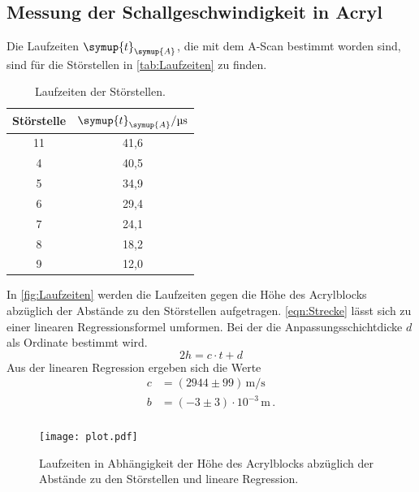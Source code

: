 \subsection{Messung der Schallgeschwindigkeit in Acryl}
\label{sec:SchallgeschwindigkeitAcryl}
Die Laufzeiten $\symup{t}_{\symup{A}}$, die mit dem A-Scan bestimmt worden sind, sind für die Störstellen in
\autoref{tab:Laufzeiten} zu finden.
\begin{table}
  \centering
  \begin{tabular}{c c}
    \toprule
    Störstelle & $\symup{t}_{\symup{A}}/\unit{\micro\second}$ \\
    \midrule
    11 & 41,6 \\
     4 & 40,5 \\
     5 & 34,9 \\
     6 & 29,4 \\
     7 & 24,1 \\
     8 & 18,2 \\
     9 & 12,0 \\
    \bottomrule
  \end{tabular}
  \caption{Laufzeiten der Störstellen.}
  \label{tab:Laufzeiten}
\end{table}
In \autoref{fig:Laufzeiten} werden die Laufzeiten gegen die Höhe des Acrylblocks abzüglich der Abstände zu den
Störstellen aufgetragen. \autoref{eqn:Strecke} lässt sich zu einer linearen Regressionsformel umformen. Bei der
die Anpassungsschichtdicke $d$ als Ordinate bestimmt wird.
\begin{equation*}
  2h = c\cdot t + d
\end{equation*} 
Aus der linearen Regression ergeben sich die Werte
\begin{align*}
  c &= (2944 \pm 99)\,\unit{\meter\per\second} \\
  b &= (-3 \pm 3)\cdot 10^{-3}\,\unit{\meter}\,. \\
\end{align*}

\begin{figure}
  \centering
  \texttt{[image: plot.pdf]}
  \caption{Laufzeiten in Abhängigkeit der Höhe des Acrylblocks abzüglich der Abstände zu den Störstellen und
  lineare Regression.}
  \label{fig:Laufzeiten}
\end{figure}

